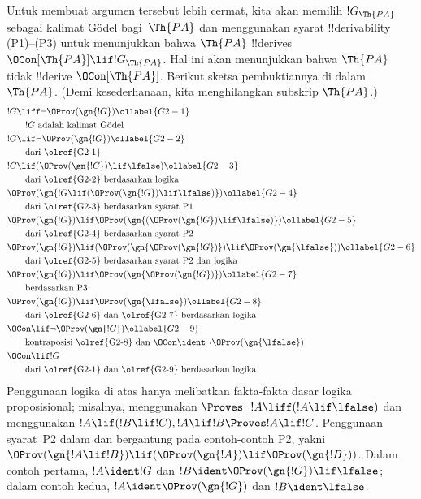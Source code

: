 \documentclass[../../../include/open-logic-section]{subfiles}
\begin{document}
Untuk membuat argumen tersebut lebih cermat, kita akan memilih
$!G_\Th{PA}$ sebagai kalimat G\"odel bagi~$\Th{PA}$ dan menggunakan
syarat !!{derivability} (P1)--(P3) untuk menunjukkan bahwa $\Th{PA}$
!!{derive}s $\OCon[\Th{PA}] \lif !G_\Th{PA}$. Hal ini akan menunjukkan
bahwa $\Th{PA}$ tidak !!{derive} $\OCon[\Th{PA}]$. Berikut sketsa
pembuktiannya di dalam~$\Th{PA}$. (Demi kesederhanaan, kita menghilangkan
subskrip $\Th{PA}$.)
\begin{align}
& !G \liff \lnot \OProv(\gn{!G}) \ollabel{G2-1}\\
& \qquad\text{$!G$ adalah kalimat G\"odel}\notag \\
& !G \lif \lnot \OProv(\gn{!G}) \ollabel{G2-2}\\
  & \qquad\text{dari \olref{G2-1}} \notag\\
& !G \lif
  (\OProv(\gn{!G}) \lif \lfalse) \ollabel{G2-3}\\
  & \qquad\text{dari \olref{G2-2} berdasarkan logika}\notag\\
& \OProv(\gn{
    !G \lif
    (\OProv(\gn{!G}) \lif \lfalse)
  }) \ollabel{G2-4}\\
  & \qquad\text{dari \olref{G2-3} berdasarkan syarat P1} \notag\\
& \OProv(\gn{!G}) \lif
  \OProv(\gn{
    (\OProv(\gn{!G}) \lif \lfalse)
    }) \ollabel{G2-5}\\
  & \qquad\text{dari \olref{G2-4} berdasarkan syarat P2} \notag\\
& \OProv(\gn{!G}) \lif (\OProv(\gn{\OProv(\gn{!G})}) \lif \OProv(\gn{\lfalse})) \ollabel{G2-6}\\
  & \qquad\text{dari \olref{G2-5} berdasarkan syarat P2 dan logika} \notag\\
& \OProv(\gn{!G}) \lif
  \OProv(\gn{\OProv(\gn{!G})}) \ollabel{G2-7}\\
   & \qquad\text{berdasarkan P3} \notag\\
& \OProv(\gn{!G}) \lif \OProv(\gn{\lfalse}) \ollabel{G2-8}\\
  & \qquad \text{dari \olref{G2-6} dan \olref{G2-7} berdasarkan logika}\notag\\
& \OCon \lif \lnot \OProv(\gn{!G}) \ollabel{G2-9}\\
  & \qquad\text{kontraposisi \olref{G2-8} dan $\OCon \ident \lnot \OProv(\gn{\lfalse})$}\notag \\
& \OCon \lif !G \notag\\
  & \qquad\text{dari \olref{G2-1} dan \olref{G2-9} berdasarkan logika}\notag
\end{align}
Penggunaan logika di atas hanya melibatkan fakta-fakta dasar logika
proposisional; misalnya,  menggunakan
$\Proves \lnot!A \liff (!A\lif \lfalse)$ dan  menggunakan
$!A \lif (!B \lif !C), !A \lif !B \Proves !A \lif !C$. Penggunaan
syarat~P2 dalam  dan  bergantung pada contoh-contoh
P2, yakni $\OProv(\gn{!A \lif !B}) \lif
(\OProv(\gn{!A}) \lif \OProv(\gn{!B}))$. Dalam contoh pertama,
$!A \ident !G$ dan $!B \ident \OProv(\gn{!G}) \lif \lfalse$; dalam
contoh kedua, $!A \ident \OProv(\gn{!G})$ dan $!B \ident \lfalse$.
\end{document}
